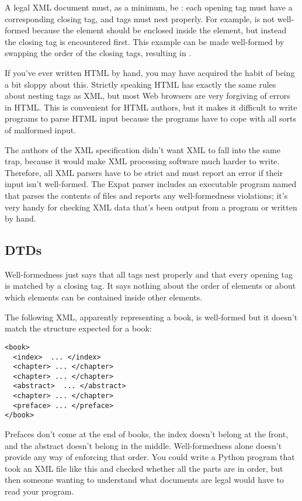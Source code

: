 \documentclass{howto}
\newcommand{\element}[1]{\code{#1}}
\begin{document}
A legal XML document must, as a minimum, be : each
opening tag must have a corresponding closing tag, and tags must nest
properly.  For example,  is not well-formed
because the \element{i} element should be enclosed inside the
\element{b} element, but instead the closing  tag is
encountered first.  This example can be made well-formed by swapping
the order of the closing tags, resulting in .

If you've ever written HTML by hand, you may have acquired the habit
of being a bit sloppy about this.  Strictly speaking HTML has exactly
the same rules about nesting tags as XML, but most Web browsers are
very forgiving of errors in HTML.  This is convenient for HTML
authors, but it makes it difficult to write programs to parse HTML
input because the programs have to cope with all sorts of malformed
input.

The authors of the XML specification didn't want XML to fall into the
same trap, because it would make XML processing software much harder
to write.  Therefore, all XML parsers have to be strict and must
report an error if their input isn't well-formed.  The Expat parser
includes an executable program named  that parses the
contents of files and reports any well-formedness violations; it's
very handy for checking XML data that's been output from a program or
written by hand.


\subsection{DTDs}

Well-formedness just says that all tags nest properly and that every
opening tag is matched by a closing tag.  It says nothing about the
order of elements or about which elements can be contained inside other
elements.

The following XML, apparently representing a book, is well-formed but
it doesn't match the structure expected for a book:

\begin{verbatim}
<book>
  <index>  ... </index>
  <chapter> ... </chapter>
  <chapter> ... </chapter>
  <abstract>  ... </abstract>
  <chapter> ... </chapter>
  <preface> ... </preface>
</book>
\end{verbatim}

Prefaces don't come at the end of books, the index doesn't belong at
the front, and the abstract doesn't belong in the middle.
Well-formedness alone doesn't provide any way of enforcing that order.
You could write a Python program that took an XML file like this and
checked whether all the parts are in order, but then someone wanting
to understand what documents are legal would have to read your program.
\end{document}
